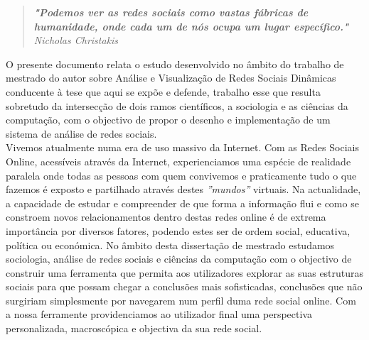 
\begin{quote}
\textit{\textbf{"Podemos ver as redes sociais como vastas fábricas de humanidade, onde cada um de nós ocupa um lugar específico."} Nicholas Christakis}
\end{quote}

O presente documento relata o estudo desenvolvido no âmbito do trabalho de mestrado do autor
sobre Análise e Visualização de Redes Sociais Dinâmicas conducente à tese que aqui se expõe e defende, trabalho esse que resulta sobretudo da intersecção de dois ramos científicos, a sociologia e as ciências da computação, com o objectivo de propor o desenho e implementação de um sistema de análise de redes sociais.\\

Vivemos atualmente numa era de uso massivo da Internet. Com as Redes Sociais Online, acessíveis através da Internet,
experienciamos uma espécie de realidade paralela onde todas as pessoas com quem convivemos e praticamente tudo o que fazemos é exposto e partilhado através destes \textit{''mundos''} virtuais. Na actualidade, a capacidade de estudar e compreender de que forma a informação flui e como se constroem novos relacionamentos dentro destas redes online é de extrema importância por diversos fatores, podendo estes ser de ordem social, educativa, política ou económica. No âmbito desta dissertação de mestrado estudamos sociologia, análise de redes sociais e ciências da computação com o objectivo de construir uma ferramenta que permita aos utilizadores explorar as suas estruturas sociais para que possam chegar a conclusões mais sofisticadas, conclusões que não surgiriam simplesmente por navegarem num perfil duma rede social online. Com a nossa ferramente providenciamos ao utilizador final uma perspectiva personalizada, macroscópica e objectiva da sua rede social.